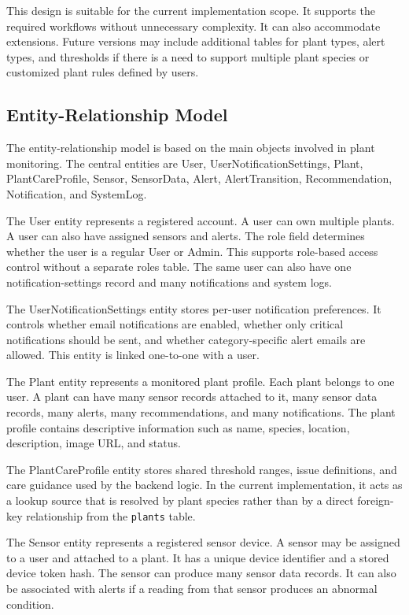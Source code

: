 This design is suitable for the current implementation scope. It supports the required workflows without unnecessary complexity. It can also accommodate extensions. Future versions may include additional tables for plant types, alert types, and thresholds if there is a need to support multiple plant species or customized plant rules defined by users.



\subsection{Entity-Relationship Model}
\label{subsec:entity-relationship-model}

The entity-relationship model is based on the main objects involved in plant monitoring. The central entities are User, UserNotificationSettings, Plant, PlantCareProfile, Sensor, SensorData, Alert, AlertTransition, Recommendation, Notification, and SystemLog.

The User entity represents a registered account. A user can own multiple plants. A user can also have assigned sensors and alerts. The role field determines whether the user is a regular User or Admin. This supports role-based access control without a separate roles table. The same user can also have one notification-settings record and many notifications and system logs.

The UserNotificationSettings entity stores per-user notification preferences. It controls whether email notifications are enabled, whether only critical notifications should be sent, and whether category-specific alert emails are allowed. This entity is linked one-to-one with a user.

The Plant entity represents a monitored plant profile. Each plant belongs to one user. A plant can have many sensor records attached to it, many sensor data records, many alerts, many recommendations, and many notifications. The plant profile contains descriptive information such as name, species, location, description, image URL, and status.

The PlantCareProfile entity stores shared threshold ranges, issue definitions, and care guidance used by the backend logic. In the current implementation, it acts as a lookup source that is resolved by plant species rather than by a direct foreign-key relationship from the \texttt{plants} table.

The Sensor entity represents a registered sensor device. A sensor may be assigned to a user and attached to a plant. It has a unique device identifier and a stored device token hash. The sensor can produce many sensor data records. It can also be associated with alerts if a reading from that sensor produces an abnormal condition.

